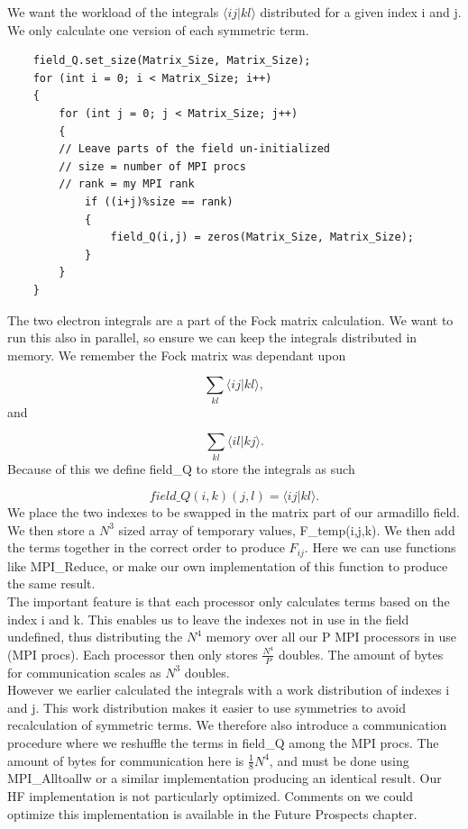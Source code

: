 \documentclass[a4paper,norsk,11pt,twoside]{report}
\begin{document}
We want the workload of the integrals $\langle i j | k l \rangle$ distributed for a given index i and j. We only calculate one version of each symmetric term. \\

\begin{lstlisting}
    field_Q.set_size(Matrix_Size, Matrix_Size);
    for (int i = 0; i < Matrix_Size; i++)
    {
        for (int j = 0; j < Matrix_Size; j++)
        {
        // Leave parts of the field un-initialized
        // size = number of MPI procs
        // rank = my MPI rank
            if ((i+j)%size == rank)
            {
                field_Q(i,j) = zeros(Matrix_Size, Matrix_Size);
            }
        }
    }
\end{lstlisting}

The two electron integrals are a part of the Fock matrix calculation. We want to run this also in parallel, so ensure we can keep the integrals distributed in memory. We remember the Fock matrix was dependant upon 

\begin{equation}
\sum_{kl} \langle i j | k l \rangle ,
\end{equation}
and

\begin{equation}
\sum_{kl} \langle i l | k j \rangle .
\end{equation}
Because of this we define field\_Q to store the integrals as such

\begin{equation}
field\_Q(i,k)(j,l) = \langle i j | k l \rangle .
\end{equation}
We place the two indexes to be swapped in the matrix part of our armadillo field. We then store a $N^3$ sized array of temporary values, F\_temp(i,j,k). We then add the terms together in the correct order to produce $F_{ij}$. Here we can use functions like MPI\_Reduce, or make our own implementation of this function to produce the same result. \\

The important feature is that each processor only calculates terms based on the index i and k. This enables us to leave the indexes not in use in the field undefined, thus distributing the $N^4$ memory over all our P MPI processors in use (MPI procs). Each processor then only stores $\frac{N^4}{P}$ doubles. The amount of bytes for communication scales as $N^3$ doubles. \\

However we earlier calculated the integrals with a work distribution of indexes i and j. This work distribution makes it easier to use symmetries to avoid recalculation of symmetric terms. We therefore also introduce a communication procedure where we reshuffle the terms in field\_Q among the MPI procs. The amount of bytes for communication here is $\frac{1}{8} N^4$, and must be done using MPI\_Alltoallw or a similar implementation producing an identical result. Our HF implementation is not particularly optimized. Comments on we could optimize this implementation is available in the Future Prospects chapter. 
\end{document}
